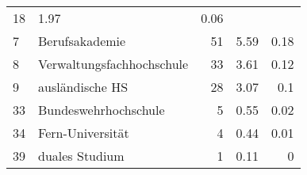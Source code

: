 \begin{longtable}{lXrrr}
       \num{18} &
       \num[round-mode=places,round-precision=2]{1.97} &
         \num[round-mode=places,round-precision=2]{0.06} \\

     7 &
     \multicolumn{1}{X}{ Berufsakademie   } &


       \num{51} &
       \num[round-mode=places,round-precision=2]{5.59} &
         \num[round-mode=places,round-precision=2]{0.18} \\

     8 &
     \multicolumn{1}{X}{ Verwaltungsfachhochschule   } &


       \num{33} &
       \num[round-mode=places,round-precision=2]{3.61} &
         \num[round-mode=places,round-precision=2]{0.12} \\

     9 &
     \multicolumn{1}{X}{ ausländische HS   } &


       \num{28} &
       \num[round-mode=places,round-precision=2]{3.07} &
         \num[round-mode=places,round-precision=2]{0.1} \\

     33 &
     \multicolumn{1}{X}{ Bundeswehrhochschule   } &


       \num{5} &
       \num[round-mode=places,round-precision=2]{0.55} &
         \num[round-mode=places,round-precision=2]{0.02} \\

     34 &
     \multicolumn{1}{X}{ Fern-Universität   } &


       \num{4} &
       \num[round-mode=places,round-precision=2]{0.44} &
         \num[round-mode=places,round-precision=2]{0.01} \\

     39 &
     \multicolumn{1}{X}{ duales Studium   } &


       \num{1} &
       \num[round-mode=places,round-precision=2]{0.11} &
         \num[round-mode=places,round-precision=2]{0} \\


\end{longtable}

